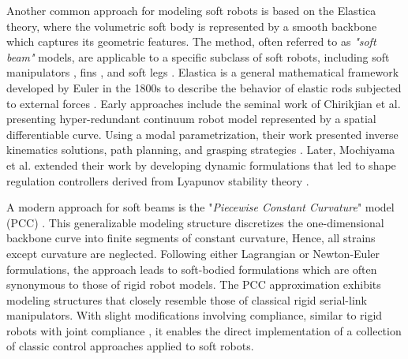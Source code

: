 Another common approach for modeling soft robots is based on the Elastica theory, where the volumetric soft body is represented by a smooth backbone which captures its geometric features. The method, often referred to as \emph{"soft beam"} models, are applicable to a specific subclass of soft robots, including soft manipulators \cite{Falkenhahn2015,Marchese2016,Jones2006,Webster2010}, fins \cite{Katzschmann2019,Marchese2014}, and soft legs \cite{Drotman2021Feb,vanLaake2022Sep}. Elastica is a general mathematical framework developed by Euler in the 1800s to describe the behavior of elastic rods subjected to external forces \cite{Levien2008,Antman2005}. Early approaches include the seminal work of Chirikjian et al. \cite{Chirikjian1989,Chirikjian1991,Chirikjian1992} presenting hyper-redundant continuum robot model represented by a spatial differentiable curve. Using a modal parametrization, their work presented inverse kinematics solutions, path planning, and grasping strategies \cite{Chirikjian1992}. Later, Mochiyama et al. \cite{Mochiyama1992,Mochiyama1999} extended their work by developing dynamic formulations that led to shape regulation controllers derived from Lyapunov stability theory \cite{Khalil2014Feb}. 

A modern approach for soft beams is the "\emph{Piecewise Constant Curvature}" model (PCC) \cite{Webster2010}. This generalizable modeling structure discretizes the one-dimensional backbone curve into finite segments of constant curvature, Hence, all strains except curvature are neglected. Following either Lagrangian or Newton-Euler formulations, the approach leads to soft-bodied formulations which are often synonymous to those of rigid robot models. The PCC approximation exhibits modeling structures that closely resemble those of classical rigid serial-link manipulators. With slight modifications involving compliance, similar to rigid robots with joint compliance \cite{DeLuca2016Jul,Lynch2017}, it enables the direct implementation of a collection of classic control approaches \cite{Katzschmann2018,DellaSantina2020,Franco2020,Franco2022May,Jones2006,Kazemipour2022May,Godage2015,Godage2016} applied to soft robots.

